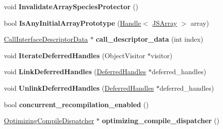 \begin{DoxyCompactItemize}
\item 
void {\bfseries Invalidate\+Array\+Species\+Protector} ()\hypertarget{classv8_1_1internal_1_1_isolate_a67dfb1a3817728da50f85be1ff6224da}{}\label{classv8_1_1internal_1_1_isolate_a67dfb1a3817728da50f85be1ff6224da}

\item 
bool {\bfseries Is\+Any\+Initial\+Array\+Prototype} (\hyperlink{classv8_1_1internal_1_1_handle}{Handle}$<$ \hyperlink{classv8_1_1internal_1_1_j_s_array}{J\+S\+Array} $>$ array)\hypertarget{classv8_1_1internal_1_1_isolate_abad340703cc7f9230f3b97c8fa2e93b1}{}\label{classv8_1_1internal_1_1_isolate_abad340703cc7f9230f3b97c8fa2e93b1}

\item 
\hyperlink{classv8_1_1internal_1_1_call_interface_descriptor_data}{Call\+Interface\+Descriptor\+Data} $\ast$ {\bfseries call\+\_\+descriptor\+\_\+data} (int index)\hypertarget{classv8_1_1internal_1_1_isolate_a3b6c6cbacec851366189364ac25ce0bc}{}\label{classv8_1_1internal_1_1_isolate_a3b6c6cbacec851366189364ac25ce0bc}

\item 
void {\bfseries Iterate\+Deferred\+Handles} (Object\+Visitor $\ast$visitor)\hypertarget{classv8_1_1internal_1_1_isolate_a9bc0edc0ab832fc31e9383321cd83233}{}\label{classv8_1_1internal_1_1_isolate_a9bc0edc0ab832fc31e9383321cd83233}

\item 
void {\bfseries Link\+Deferred\+Handles} (\hyperlink{classv8_1_1internal_1_1_deferred_handles}{Deferred\+Handles} $\ast$deferred\+\_\+handles)\hypertarget{classv8_1_1internal_1_1_isolate_ad40a0a2361ce9d4f44de9fbf9b7c9130}{}\label{classv8_1_1internal_1_1_isolate_ad40a0a2361ce9d4f44de9fbf9b7c9130}

\item 
void {\bfseries Unlink\+Deferred\+Handles} (\hyperlink{classv8_1_1internal_1_1_deferred_handles}{Deferred\+Handles} $\ast$deferred\+\_\+handles)\hypertarget{classv8_1_1internal_1_1_isolate_a07a4e40eb803a30794e372aca7f0ff11}{}\label{classv8_1_1internal_1_1_isolate_a07a4e40eb803a30794e372aca7f0ff11}

\item 
bool {\bfseries concurrent\+\_\+recompilation\+\_\+enabled} ()\hypertarget{classv8_1_1internal_1_1_isolate_ad2b367fff0549b42f75e6390d1729d68}{}\label{classv8_1_1internal_1_1_isolate_ad2b367fff0549b42f75e6390d1729d68}

\item 
\hyperlink{classv8_1_1internal_1_1_optimizing_compile_dispatcher}{Optimizing\+Compile\+Dispatcher} $\ast$ {\bfseries optimizing\+\_\+compile\+\_\+dispatcher} ()\hypertarget{classv8_1_1internal_1_1_isolate_a6c0aa7adb516c0df9e03e9b7cee59729}{}\label{classv8_1_1internal_1_1_isolate_a6c0aa7adb516c0df9e03e9b7cee59729}


\end{DoxyCompactItemize}
